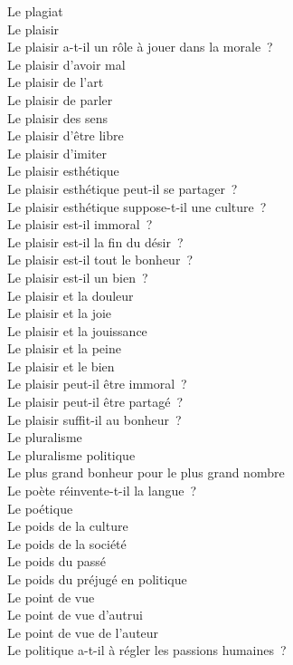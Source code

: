 \documentclass[a4paper,12pt]{article}
\begin{document}
Le plagiat \\
Le plaisir \\
Le plaisir a-t-il un rôle à jouer dans la morale ? \\
Le plaisir d'avoir mal \\
Le plaisir de l'art \\
Le plaisir de parler \\
Le plaisir des sens \\
Le plaisir d'être libre \\
Le plaisir d'imiter \\
Le plaisir esthétique \\
Le plaisir esthétique peut-il se partager ? \\
Le plaisir esthétique suppose-t-il une culture ? \\
Le plaisir est-il immoral ? \\
Le plaisir est-il la fin du désir ? \\
Le plaisir est-il tout le bonheur ? \\
Le plaisir est-il un bien ? \\
Le plaisir et la douleur \\
Le plaisir et la joie \\
Le plaisir et la jouissance \\
Le plaisir et la peine \\
Le plaisir et le bien \\
Le plaisir peut-il être immoral ? \\
Le plaisir peut-il être partagé ? \\
Le plaisir suffit-il au bonheur ? \\
Le pluralisme \\
Le pluralisme politique \\
Le plus grand bonheur pour le plus grand nombre \\
Le poète réinvente-t-il la langue ? \\
Le poétique \\
Le poids de la culture \\
Le poids de la société \\
Le poids du passé \\
Le poids du préjugé en politique \\
Le point de vue \\
Le point de vue d'autrui \\
Le point de vue de l'auteur \\
Le politique a-t-il à régler les passions humaines ? \\
\end{document}

